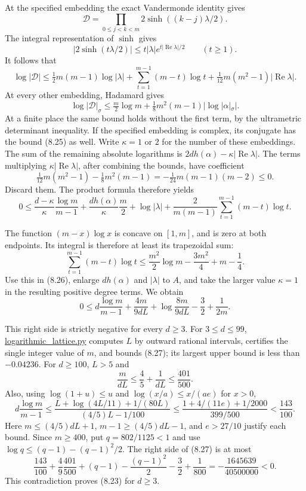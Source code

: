 \documentclass[
  11pt,
  a4paper,
]{article}
\begin{document}
At the specified embedding the exact Vandermonde identity gives \[
\mathcal D=\prod_{0\le j<k<m}2\sinh((k-j)\lambda/2).
\] The integral representation of \(\sinh\) gives \[
|2\sinh(t\lambda/2)|\le t|\lambda|e^{t|\operatorname{Re}\lambda|/2}
\qquad(t\ge1).
\] It follows that \[
\log|\mathcal D|
\le\tfrac12m(m-1)\log|\lambda|
+\sum_{t=1}^{m-1}(m-t)\log t
+\tfrac1{12}m(m^2-1)|\operatorname{Re}\lambda|.
\tag{8.25}
\] At every other embedding, Hadamard gives \[
\log|\mathcal D|_\sigma
\le\tfrac m2\log m+
\tfrac18m^2(m-1)|\log|\alpha|_\sigma|.
\] At a finite place the same bound holds without the first term, by the
ultrametric determinant inequality. If the specified embedding is
complex, its conjugate has the bound (8.25) as well. Write \(\kappa=1\)
or \(2\) for the number of these embeddings. The sum of the remaining
absolute logarithms is
\(2d h(\alpha)-\kappa|\operatorname{Re}\lambda|\). The terms multiplying
\(\kappa|\operatorname{Re}\lambda|\), after combining the bounds, have
coefficient \[
\tfrac1{12}m(m^2-1)-\tfrac18m^2(m-1)
=-\tfrac1{24}m(m-1)(m-2)\le0.
\] Discard them. The product formula therefore yields \[
0\le
\frac{d-\kappa}{\kappa}\frac{\log m}{m-1}
+\frac{d h(\alpha)}{\kappa}\frac m2
+\log|\lambda|
+\frac2{m(m-1)}\sum_{t=1}^{m-1}(m-t)\log t.
\tag{8.26}
\]

The function \((m-x)\log x\) is concave on \([1,m]\), and is zero at
both endpoints. Its integral is therefore at least its trapezoidal sum:
\[
\sum_{t=1}^{m-1}(m-t)\log t
\le \frac{m^2}2\log m-\frac{3m^2}4+m-\frac14.
\] Use this in (8.26), enlarge \(d h(\alpha)\) and \(|\lambda|\) to
\(A\), and take the larger value \(\kappa=1\) in the resulting positive
degree terms. We obtain \[
0\le d\frac{\log m}{m-1}
+\frac{4m}{9dL}+\log\frac{8m}{9dL}
-\frac32+\frac1{2m}.
\tag{8.27}
\]

This right side is strictly negative for every \(d\ge3\). For
\(3\le d\le99\),
\href{https://kokunoyumeto.github.io/open-math-courses-public/courses/TR-BAKER/verification/logarithmic_lattice.py}{logarithmic\_lattice.py}
computes \(L\) by outward rational intervals, certifies the single
integer value of \(m\), and bounds (8.27); its largest upper bound is
less than \(-0.04236\). For \(d\ge100\), \(L>5\) and \[
\frac m{dL}\le\frac45+\frac1{dL}\le\frac{401}{500}.
\] Also, using \(\log(1+u)\le u\) and \(\log(x/a)\le x/(ae)\) for
\(x>0\), \[
d\frac{\log m}{m-1}
\le\frac{L+\log(4L/11)+1/(80L)}{(4/5)L-1/100}
\le
\frac{1+4/(11e)+1/2000}{399/500}<\frac{143}{100}.
\] Here \(m\le(4/5)dL+1\), \(m-1\ge(4/5)dL-1\), and \(e>27/10\) justify
each bound. Since \(m\ge400\), put \(q=802/1125<1\) and use
\(\log q\le(q-1)-(q-1)^2/2\). The right side of (8.27) is at most \[
\frac{143}{100}
+\frac49\frac{401}{500}
+(q-1)-\frac{(q-1)^2}{2}
-\frac32+\frac1{800}
=-\frac{1645639}{40500000}<0.
\] This contradiction proves (8.23) for \(d\ge3\).
\end{document}
